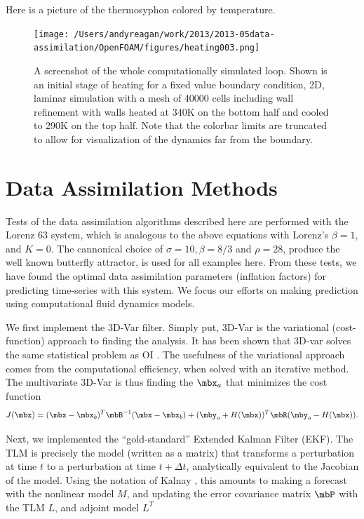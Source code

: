 Here is a picture of the thermosyphon colored by temperature.
\begin{figure}[h!]
  \centering
  \texttt{[image: /Users/andyreagan/work/2013/2013-05data-assimilation/OpenFOAM/figures/heating003.png]}
  \caption[A screenshot of the whole simulated loop]{
  A screenshot of the whole computationally simulated loop.
  Shown is an initial stage of heating for a fixed value boundary condition, 2D, laminar simulation with a mesh of 40000 cells including wall refinement with walls heated at 340K on the bottom half and cooled to 290K on the top half.
  Note that the colorbar limits are truncated to allow for visualization of the dynamics far from the boundary.
  }
  \label{fig:CFDloopSS}
\end{figure}




\section{Data Assimilation Methods}

Tests of the data assimilation algorithms described here are performed with the Lorenz 63 system, which is analogous to the above equations with Lorenz's $\beta = 1$, and $K = 0$.
The cannonical choice of $\sigma = 10, \beta = 8/3$ and $\rho = 28$, produce the well known butterfly attractor, is used for all examples here.
From these tests, we have found the optimal data assimilation parameters (inflation factors) for predicting time-series with this system.
We focus our efforts on making prediction using computational fluid dynamics models.

We first implement the 3D-Var filter.
Simply put, 3D-Var is the variational (cost-function) approach to finding the analysis.
It has been shown that 3D-var solves the same statistical problem as OI \cite{lorenc1986analysis}.
The usefulness of the variational approach comes from the computational efficiency, when solved with an iterative method.
The multivariate 3D-Var is thus finding the $\mbx _a$ that minimizes the cost function
\begin{equation} J(\mbx) = (\mbx - \mbx_b) ^T \mbB ^{-1} (\mbx - \mbx_b) + (\mby_o + H(\mbx))^T\mbR (\mby_o - H(\mbx)) .\end{equation}

Next, we implemented the ``gold-standard'' Extended Kalman Filter (EKF).
The TLM is precisely the model (written as a matrix) that transforms a perturbation at time $t$ to a perturbation at time $t+\Delta t$, analytically equivalent to the Jacobian of the model.
Using the notation of Kalnay \cite{kalnay2003}, this amounts to making a forecast with the nonlinear model $M$, and updating the error covariance matrix $\mbP$ with the TLM $L$, and adjoint model $L^T$

